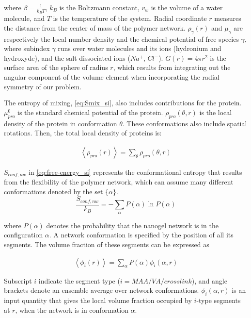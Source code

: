 \documentclass[journal=jacsat,manuscript=suppinfo]{achemso}
\begin{document}
\noindent where $\beta = \frac{1}{k_BT}$, $k_B$ is the Boltzmann constant, $v_w$ is the volume of a water molecule, and $T$ is the temperature of the system.
Radial coordinate $r$ measures the distance from the center of mass of the polymer network.
$\rho_\gamma(r)$ and $\mu_\gamma$ are respectively the local number density and the chemical potential of free species $\gamma$, where  
subindex $\gamma$ runs over water molecules and its ions (hydronium and hydroxyde), and the salt dissociated ions ($Na^+$, $Cl^-$).
$G(r)=4\pi r^2$ is the surface area of the sphere of radius $r$, which results from integrating out the angular component of the volume element when incorporating the radial symmetry of our problem.



The entropy of mixing, \cref{eq:Smix_si}, also includes contributions for the protein.
$\mu^0_{pro}$ is the standard chemical potential of the protein.
$\rho_{pro}(\theta,r)$ is the local density of the protein in conformation $\theta$.
These conformations also include spatial rotations.
Then, the total local density of proteins is:

\begin{align}
	\left<\rho_{pro}(r)\right> = \sum_\theta{\rho_{pro}(\theta,r)}
\end{align}

$S_{conf,nw}$ in \cref{eq:free-energy_si} represents the conformational entropy that results from the flexibility of the polymer network, which can assume many different conformations denoted by the set $\{\alpha\}$. 
\begin{equation}
	\frac{S_{conf,nw}}{k_B} = - \sum_{\alpha}{P(\alpha)\ln P(\alpha)}
\end{equation}

\noindent where $P(\alpha)$ denotes the probability that the nanogel network is in the configuration $\alpha$.
A network conformation is specified by the position of all its segments.
The volume fraction of these segments can be expressed as



\begin{align}
	\left< \phi_i(r)\right> = \sum_\alpha{P(\alpha)\phi_i(\alpha,r)}
\end{align}

\noindent  Subscript $i$ indicate the segment type ($i = MAA/VA/crosslink$), and angle brackets denote an ensemble average over network conformations. 
$\phi_i(\alpha,r)$ is an input quantity that gives the local volume fraction occupied by $i$-type segments at $r$, when the network is in conformation $\alpha$.
\end{document}
